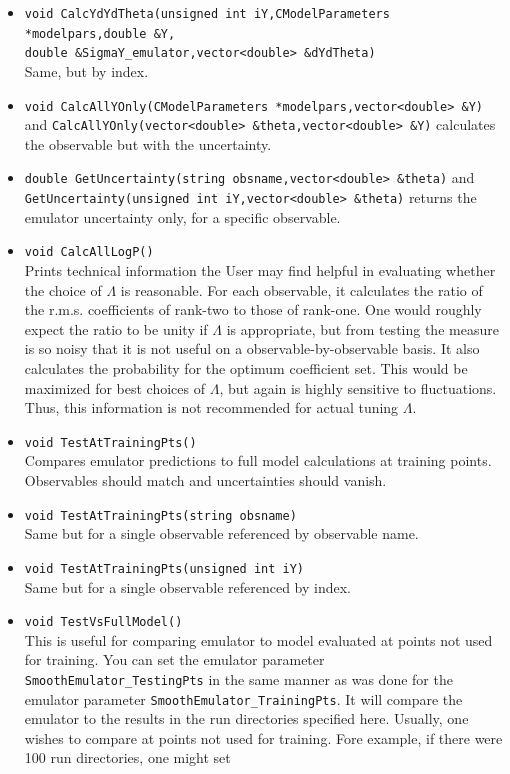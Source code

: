 \documentclass[UserManual.tex]{subfiles}
\begin{document}
\begin{sloppypar}
\begin{itemize}
Same, but for one observable referenced by observable name.
\item {\tt void CalcYdYdTheta(unsigned int iY,CModelParameters *modelpars,double \&Y,\\double \&SigmaY\_emulator,vector<double> \&dYdTheta)}\\
Same, but by index.
\item {\tt void CalcAllYOnly(CModelParameters *modelpars,vector<double> \&Y)} and {\tt CalcAllYOnly(vector<double> \&theta,vector<double> \&Y)} calculates the observable but with the uncertainty.
\item {\tt double GetUncertainty(string obsname,vector<double> \&theta)} and {\tt GetUncertainty(unsigned int iY,vector<double> \&theta)} returns the emulator uncertainty only, for a specific observable.		
\item {\tt void CalcAllLogP()}\\
Prints technical information the User may find helpful in evaluating whether the choice of $\Lambda$ is reasonable. For each observable, it calculates the ratio of the r.m.s. coefficients of rank-two to those of rank-one. One would roughly expect the ratio to be unity if $\Lambda$ is appropriate, but from testing the measure is so noisy that it is not useful on a observable-by-observable basis. It also calculates the probability for the optimum coefficient set. This would be maximized for best choices of $\Lambda$, but again is highly sensitive to fluctuations. Thus, this information is not recommended for actual tuning $\Lambda$.
\item {\tt void TestAtTrainingPts()}\\
Compares emulator predictions to full model calculations at training points. Observables should match and uncertainties should vanish.
\item {\tt void TestAtTrainingPts(string obsname)}\\
Same but for a single observable referenced by observable name.
\item {\tt void TestAtTrainingPts(unsigned int iY)}\\
Same but for a single observable referenced by index.
\item {\tt void TestVsFullModel()}\\
This is useful for comparing emulator to model evaluated at points not used for training. You can set the emulator parameter {\tt SmoothEmulator\_TestingPts} in the same manner as was done for the emulator parameter {\tt SmoothEmulator\_TrainingPts}. It will compare the emulator to the results in the run directories specified here. Usually, one wishes to compare at points not used for training. Fore example, if there were 100 run directories, one might set

\end{itemize}
\end{sloppypar}
\end{document}
